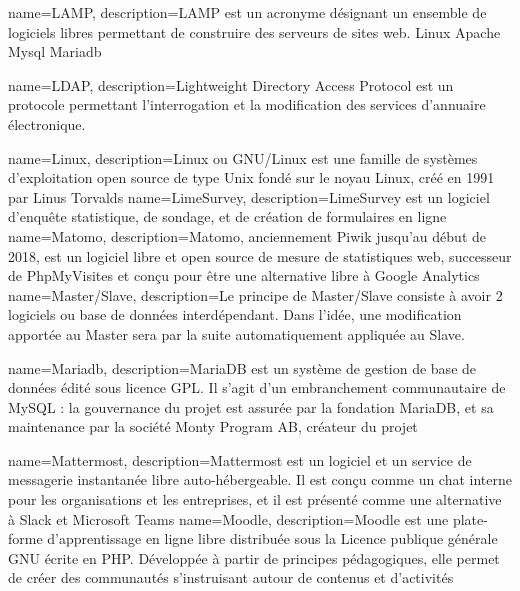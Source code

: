 {
    name=LAMP,
    description={LAMP est un acronyme désignant un ensemble de logiciels libres permettant de construire des serveurs de sites web. Linux Apache Mysql Mariadb}
}

{
    name=LDAP,
    description={Lightweight Directory Access Protocol est un protocole permettant l'interrogation et la modification des services d'annuaire électronique.}
}

{
    name=Linux,
    description={Linux ou GNU/Linux est une famille de systèmes d'exploitation open source de type Unix fondé sur le noyau Linux, créé en 1991 par Linus Torvalds}
}
{
    name=LimeSurvey,
    description={LimeSurvey est un logiciel d'enquête statistique, de sondage, et de création de formulaires en ligne}
}
{
    name=Matomo,
    description={Matomo, anciennement Piwik jusqu’au début de 2018, est un logiciel libre et open source de mesure de statistiques web, successeur de PhpMyVisites et conçu pour être une alternative libre à Google Analytics}
}
{
    name=Master/Slave,
    description={Le principe de Master/Slave consiste à avoir 2 logiciels ou base de données interdépendant. Dans l'idée, une modification apportée au Master sera par la suite automatiquement appliquée au Slave.}
}

{
    name=Mariadb,
    description={MariaDB est un système de gestion de base de données édité sous licence GPL. Il s'agit d'un embranchement communautaire de MySQL : la gouvernance du projet est assurée par la fondation MariaDB, et sa maintenance par la société Monty Program AB, créateur du projet}
}


{
    name=Mattermost,
    description={Mattermost est un logiciel et un service de messagerie instantanée libre auto-hébergeable. Il est conçu comme un chat interne pour les organisations et les entreprises, et il est présenté comme une alternative à Slack et Microsoft Teams}
}
{
    name=Moodle,
    description={Moodle est une plate-forme d'apprentissage en ligne libre distribuée sous la Licence publique générale GNU écrite en PHP. Développée à partir de principes pédagogiques, elle permet de créer des communautés s'instruisant autour de contenus et d'activités}
}

